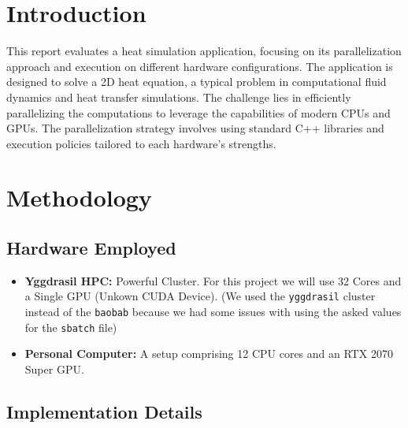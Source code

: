 \documentclass[11pt]{article}
\begin{document}
    
    \maketitle
    \thispagestyle{empty}
    \newpage

    \tableofcontents
    
    \newpage
    
    \hypertarget{introduction}{%
    \section{Introduction}\label{introduction}}

    This report evaluates a heat simulation application, focusing on its
    parallelization approach and execution on different hardware
    configurations. The application is designed to solve a 2D heat equation,
    a typical problem in computational fluid dynamics and heat transfer
    simulations. The challenge lies in efficiently parallelizing the
    computations to leverage the capabilities of modern CPUs and GPUs. The
    parallelization strategy involves using standard C++ libraries and
    execution policies tailored to each hardware's strengths.

    \hypertarget{methodology}{%
    \section{Methodology}\label{methodology}}

    \hypertarget{hardware-employed}{%
    \subsection{Hardware Employed}\label{hardware-employed}}

    \begin{itemize}

    \item
      \textbf{Yggdrasil HPC:} Powerful Cluster. For this project we will use 32 Cores and a Single GPU (Unkown CUDA Device). 
      (We used the \texttt{yggdrasil} cluster instead of the \texttt{baobab} because we had some issues with using the asked values for the \texttt{sbatch} file)
    \item
      \textbf{Personal Computer:} A setup comprising 12 CPU cores and an RTX 2070 Super GPU.
    \end{itemize}

    \hypertarget{implementation-details}{%
    \subsection{Implementation Details}\label{implementation-details}}
\end{document}
